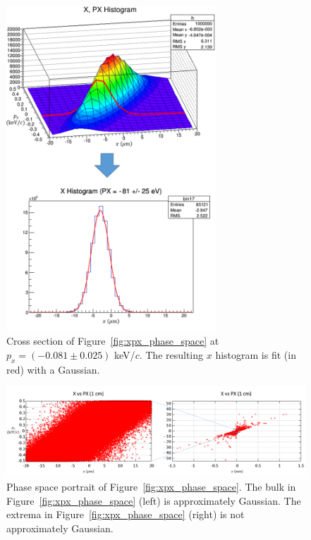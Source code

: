 \begin{figure}[H]
  \centering
    \includegraphics[width=0.7\textwidth]{Figures/xpx_phase_space_cut} 
  \caption[Cross section of Figure~\ref{fig:xpx_phase_space} at $p_x=0.08$ keV/$c$.]{Cross section of Figure~\ref{fig:xpx_phase_space} at $p_x=(-0.081 \pm 0.025)$ keV/$c$. The resulting $x$ histogram is fit (in red) with a Gaussian.}
  \label{fig:xpx_phase_space_cut}
\end{figure}

\begin{figure}[H]
  \centering
    \includegraphics[width=\textwidth]{Figures/phase_space_portrait} 
  \caption[Phase space portrait of Figure~\ref{fig:xpx_phase_space}.]{Phase space portrait of Figure~\ref{fig:xpx_phase_space}. The bulk in Figure~\ref{fig:xpx_phase_space} (left) is approximately Gaussian. The extrema in Figure~\ref{fig:xpx_phase_space} (right) is not approximately Gaussian.}
  \label{fig:phase_space_portrait}
\end{figure}

